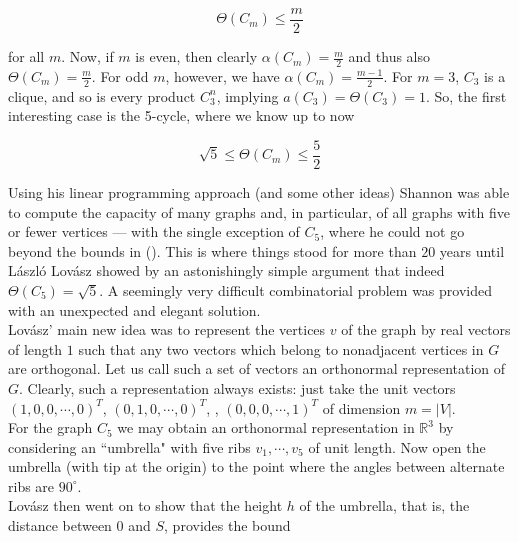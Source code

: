 \documentclass[12pt]{memoir}
\begin{document}
\begin{equation*}
  \Theta(C_m) \leq \frac{m}{2}
\end{equation*}

for all $m$. Now, if $m$ is even, then clearly $\alpha(C_m) = \frac{m}{2}$
and thus also $\Theta(C_m) = \frac{m}{2}$. For odd $m$, however, we have $\alpha(C_m) = \frac{m-1}{2}$. 
For $m = 3$, $C_3$ is a clique, and so is every product $C_3^n$, implying $a(C_3) = \Theta(C_3) = 1$. 
So, the first interesting case is the 5-cycle, where we know up to now 

\begin{equation}
  \sqrt{5} \leq \Theta(C_m) \leq \frac{5}{2} \label{three}
\end{equation}

Using his linear programming approach (and some other ideas) Shannon 
was able to compute the capacity of many graphs and, in particular, of all 
graphs with five or fewer vertices --- with the single exception of $C_5$, where 
he could not go beyond the bounds in (). This is where things stood for 
more than $20$ years until L\'aszl\'o Lov\'asz showed by an astonishingly simple argument
that indeed $\Theta(C_5) = \sqrt{5}$. A seemingly very difficult combinatorial 
problem was provided with an unexpected and elegant solution.\\

Lov\'asz' main new idea was to represent the vertices $v$ of the graph by 
real vectors of length $1$ such that any two vectors which belong to nonadjacent 
vertices in $G$ are orthogonal. Let us call such a set of vectors 
an orthonormal representation of $G$. Clearly, such a representation always 
exists: just take the unit vectors $(1,0,0,\dotsb,0)^T$, $(0,1,0,\dotsb,0)^T$, \dotsb,
$(0,0,0,\dotsb,1)^T$ of dimension $m=|V|$.\\


For the graph $C_5$ we may obtain an orthonormal representation in $\mathbb{R}^3$ by 
considering an ``umbrella" with five ribs $v_1, \dotsb , v_5$ of unit length. Now 
open the umbrella (with tip at the origin) to the point where the angles 
between alternate ribs are $90^\circ$. \\
Lov\'asz then went on to show that the height $h$ of the umbrella, that is, the 
distance between $0$ and $S$, provides the bound
\end{document}
